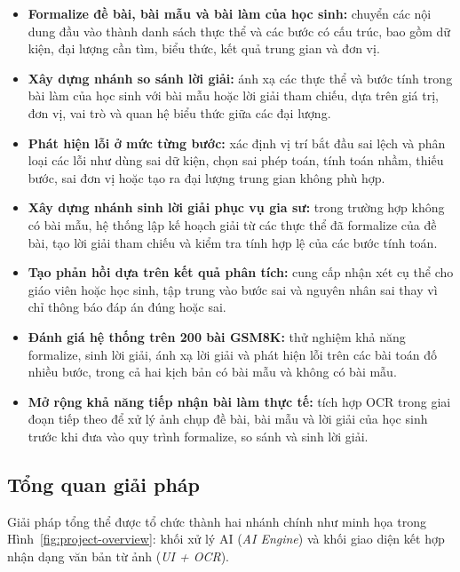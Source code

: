 \documentclass[12pt,a4paper]{article}
\begin{document}
\begin{itemize}[leftmargin=*]
\item \textbf{Formalize đề bài, bài mẫu và bài làm của học sinh:}
chuyển các nội dung đầu vào thành danh sách thực thể và các bước có cấu trúc, bao gồm dữ kiện, đại lượng cần tìm, biểu thức, kết quả trung gian và đơn vị.

\item \textbf{Xây dựng nhánh so sánh lời giải:}
ánh xạ các thực thể và bước tính trong bài làm của học sinh với bài mẫu hoặc lời giải tham chiếu, dựa trên giá trị, đơn vị, vai trò và quan hệ biểu thức giữa các đại lượng.

\item \textbf{Phát hiện lỗi ở mức từng bước:}
xác định vị trí bắt đầu sai lệch và phân loại các lỗi như dùng sai dữ kiện, chọn sai phép toán, tính toán nhầm, thiếu bước, sai đơn vị hoặc tạo ra đại lượng trung gian không phù hợp.

\item \textbf{Xây dựng nhánh sinh lời giải phục vụ gia sư:}
trong trường hợp không có bài mẫu, hệ thống lập kế hoạch giải từ các thực thể đã formalize của đề bài, tạo lời giải tham chiếu và kiểm tra tính hợp lệ của các bước tính toán.

\item \textbf{Tạo phản hồi dựa trên kết quả phân tích:}
cung cấp nhận xét cụ thể cho giáo viên hoặc học sinh, tập trung vào bước sai và nguyên nhân sai thay vì chỉ thông báo đáp án đúng hoặc sai.

\item \textbf{Đánh giá hệ thống trên 200 bài GSM8K:}
thử nghiệm khả năng formalize, sinh lời giải, ánh xạ lời giải và phát hiện lỗi trên các bài toán đố nhiều bước, trong cả hai kịch bản có bài mẫu và không có bài mẫu.

\item \textbf{Mở rộng khả năng tiếp nhận bài làm thực tế:}
tích hợp OCR trong giai đoạn tiếp theo để xử lý ảnh chụp đề bài, bài mẫu và lời giải của học sinh trước khi đưa vào quy trình formalize, so sánh và sinh lời giải.

\end{itemize}





\subsection{Tổng quan giải pháp}
Giải pháp tổng thể được tổ chức thành hai nhánh chính như minh họa trong
Hình~\ref{fig:project-overview}: khối xử lý AI (\textit{AI Engine})
và khối giao diện kết hợp nhận dạng văn bản từ ảnh (\textit{UI + OCR}).
\end{document}
